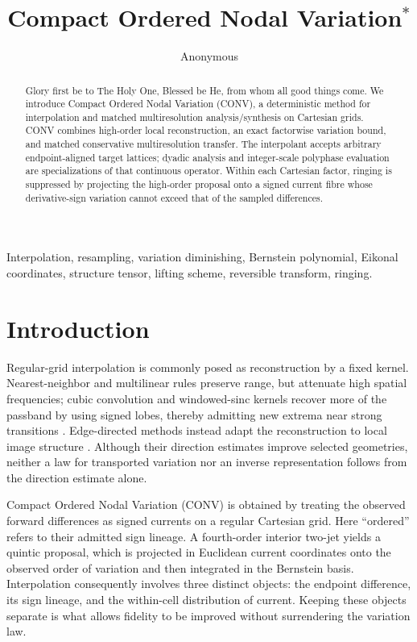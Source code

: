 \documentclass[journal]{IEEEtran}
\title{Compact Ordered Nodal Variation\texorpdfstring{$^{*}$}{*}}
\author{Anonymous}
\date{}
\begin{document}
\maketitle
\begingroup
\renewcommand{\thefootnote}{\fnsymbol{footnote}}
\endgroup

\begin{abstract}
Glory first be to The Holy One, Blessed be He, from whom all good things
come. We introduce Compact Ordered Nodal Variation (CONV), a
deterministic method for interpolation and matched
multiresolution analysis/synthesis on Cartesian grids. CONV combines
high-order local reconstruction, an exact factorwise variation bound, and
matched conservative multiresolution transfer. The interpolant accepts
arbitrary endpoint-aligned target lattices; dyadic analysis and integer-scale
polyphase evaluation are specializations of that continuous operator.
Within each Cartesian factor, ringing is suppressed by projecting the
high-order proposal onto a signed current fibre whose derivative-sign
variation cannot exceed that of the sampled differences.
\end{abstract}

\begin{IEEEkeywords}
Interpolation, resampling, variation diminishing, Bernstein polynomial,
Eikonal coordinates, structure tensor, lifting scheme, reversible transform,
ringing.
\end{IEEEkeywords}

\section{Introduction}

Regular-grid interpolation is commonly posed as reconstruction by a fixed
kernel. Nearest-neighbor and multilinear rules preserve range, but attenuate
high spatial frequencies; cubic convolution and windowed-sinc kernels recover
more of the passband by using signed lobes, thereby admitting new extrema near
strong transitions \cite{keys1981,lanczos1956}. Edge-directed methods instead
adapt the reconstruction to local image structure \cite{li2001,lottes2021}.
Although their direction estimates improve selected geometries, neither a
law for transported variation nor an inverse representation follows from the
direction estimate alone.

Compact Ordered Nodal Variation (CONV) is obtained by treating the observed
forward differences as signed currents on a regular Cartesian grid. Here
``ordered'' refers to their admitted sign lineage. A fourth-order interior
two-jet yields a quintic proposal, which is projected in Euclidean current
coordinates onto the observed order of variation and then integrated in the
Bernstein basis. Interpolation consequently involves three distinct objects:
the endpoint difference, its sign lineage, and the within-cell distribution
of current. Keeping these objects separate is what allows fidelity to be
improved without surrendering the variation law.
\end{document}
